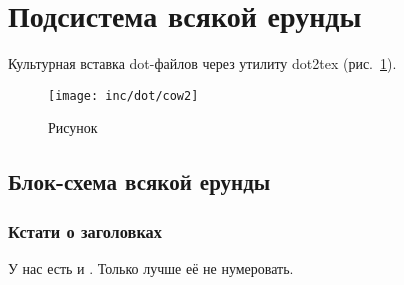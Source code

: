 \section{Подсистема всякой ерунды}

Культурная вставка dot-файлов через утилиту dot2tex (рис.~\ref{fig:fig02}).

\begin{figure}
  \centering
  \texttt{[image: inc/dot/cow2]}
  \caption{Рисунок}
  \label{fig:fig02}
\end{figure}


\subsection{Блок-схема всякой ерунды}

\subsubsection*{Кстати о заголовках}

У нас есть и . Только лучше её не нумеровать.

